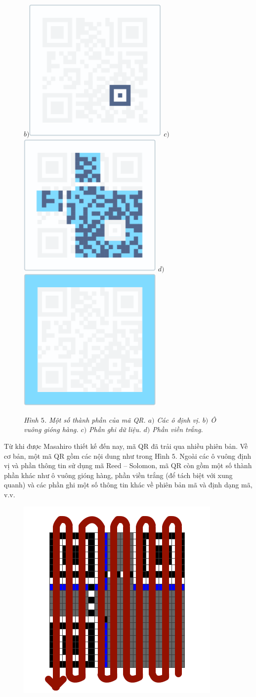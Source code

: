 \begin{multicols}{2}
\begin{figure}[H]
		$b)$\includegraphics[height=0.35\linewidth]{8}
		$c)$\includegraphics[height=0.35\linewidth]{9}
		$d)$\includegraphics[height=0.35\linewidth]{10}
		\caption{\small\textit{\color{toanhocdoisong}Hình $5$. Một số thành phần của mã QR. $a)$ Các ô định vị. $b)$ Ô vuông gióng hàng. $c)$ Phần ghi dữ liệu. $d)$ Phần viền trắng.}}
		\vspace*{-10pt}
	\end{figure}
	Từ khi được Masahiro thiết kế đến nay, mã QR đã trải qua nhiều phiên bản. Về cơ bản, một mã QR gồm các nội dung như trong Hình $5$. Ngoài các ô vuông định vị và phần thông tin sử dụng mã Reed -- Solomon, mã QR còn gồm một số thành phần khác như ô vuông gióng hàng, phần viền trắng (để tách biệt với xung quanh) và các phần ghi một số thông tin khác về phiên bản mã và định dạng mã, v.v. 
	\begin{figure}[H]
		\vspace*{-5pt}
		\centering
		\captionsetup{labelformat= empty, justification=centering}
		\includegraphics[height=0.35\linewidth]{11}
		

\end{figure}
\end{multicols}
